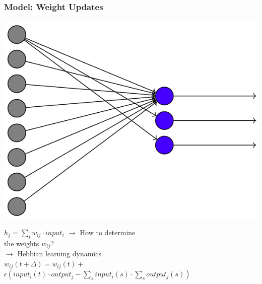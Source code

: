 \begin{frame}
\frametitle{Model: Weight Updates}
\begin{multicols}{2}
\begin{center}
\includegraphics[scale=.1]{pics/model_output}
\end{center}
\columnbreak
\begin{center}
$h_j = \sum_i w_{ij} \cdot input_i$
\vskip 5mm
$\rightarrow$ How to determine\\ \hskip 4mm the weights $w_{ij}$?\\
$\rightarrow$ Hebbian learning dynamics\\
\vskip 4mm
$w_{ij}(t+\Delta)=w_{ij}(t)+$\\
$ \epsilon (input_i(t)\cdot output_j - \sum_s input_i (s) \cdot \sum_s output_j(s))$
\end{center}
\end{multicols}
\end{frame}
